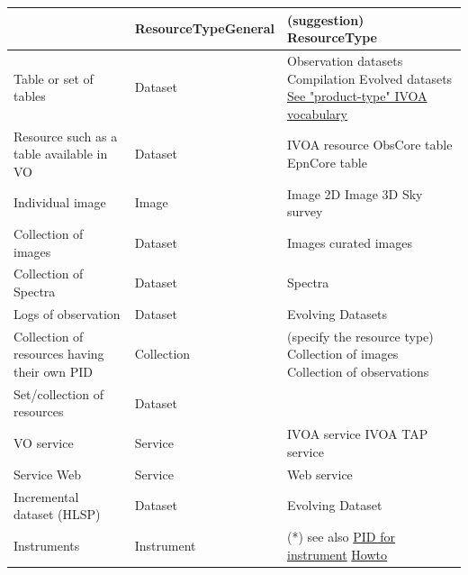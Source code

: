 \documentclass[11pt,a4paper]{ivoa}
\begin{document}
\begin{tabular}{|p{}|p{}|p{}|}
\hline
 & \textbf{\small{ResourceTypeGeneral}} & (suggestion) \textbf{ResourceType}\\
\hline
Table or set of tables & Dataset & 
    Observation datasets \newline
  	Compilation \newline
  	Evolved datasets \newline
    \href{https://www.ivoa.net/rdf/product-type/2024-05-19/product-type.html}{See "product-type" IVOA vocabulary}
	\\ \hline
Resource such as a table available in VO & Dataset & 
    IVOA resource \newline
    ObsCore table \newline
    EpnCore table\\\hline
Individual image & Image & 
    Image 2D \newline
    Image 3D \newline
    Sky survey\\ \hline
Collection of images & Dataset & 
    Images \newline
    curated images\\ \hline
Collection of Spectra & Dataset & Spectra\\ \hline
Logs of observation & Dataset & Evolving Datasets\\ \hline
Collection of resources having their own PID & Collection & 
    (specify the resource type) \newline
    Collection of images \newline
    Collection of observations \\ \hline
Set/collection of resources & Dataset & \\ \hline
VO service & Service & 
    IVOA service\newline
    IVOA TAP service  \\ \hline
Service Web & Service & Web service\\ \hline
Incremental dataset (HLSP) & Dataset & Evolving Dataset\\ \hline
Instruments & Instrument & (*) see also \href{https://docs.pidinst.org/en/latest/}{PID for instrument} \href{https://docs.pidinst.org/en/latest/datacite-cookbook/metadata.html#mapping-of-pidinst-metadata-onto-datacite}{Howto}\\
\hline
\end{tabular}\newline
\end{document}
